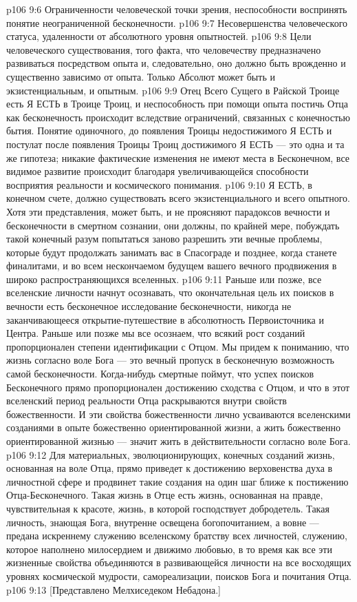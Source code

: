 \vs p106 9:6 \bibnobreakspace Ограниченности человеческой точки зрения, неспособности воспринять понятие неограниченной бесконечности.
\vs p106 9:7 \bibnobreakspace Несовершенства человеческого статуса, удаленности от абсолютного уровня опытностей.
\vs p106 9:8 \bibnobreakspace Цели человеческого существования, того факта, что человечеству предназначено развиваться посредством опыта и, следовательно, оно должно быть врожденно и существенно зависимо от опыта. Только Абсолют может быть и экзистенциальным, и опытным.
\vs p106 9:9 \pc Отец Всего Сущего в Райской Троице есть Я ЕСТЬ в Троице Троиц, и неспособность при помощи опыта постичь Отца как бесконечность происходит вследствие ограничений, связанных с конечностью бытия. Понятие  одиночного, до появления Троицы недостижимого Я ЕСТЬ и постулат  после появления Троицы Троиц достижимого Я ЕСТЬ --- это одна и та же гипотеза; никакие фактические изменения не имеют места в Бесконечном, все видимое развитие происходит благодаря увеличивающейся способности восприятия реальности и космического понимания.
\vs p106 9:10 Я ЕСТЬ, в конечном счете, должно существовать  всего экзистенциального и  всего опытного. Хотя эти представления, может быть, и не проясняют парадоксов вечности и бесконечности в смертном сознании, они должны, по крайней мере, побуждать такой конечный разум попытаться заново разрешить эти вечные проблемы, которые будут продолжать занимать вас в Спасограде и позднее, когда станете финалитами, и во всем нескончаемом будущем вашего вечного продвижения в широко распространяющихся вселенных.
\vs p106 9:11 \pc Раньше или позже, все вселенские личности начнут осознавать, что окончательная цель их поисков в вечности есть бесконечное исследование бесконечности, никогда не заканчивающееся открытие\hyp{}путешествие в абсолютность Первоисточника и Центра. Раньше или позже мы все осознаем, что всякий рост созданий пропорционален степени идентификации с Отцом. Мы придем к пониманию, что жизнь согласно воле Бога --- это вечный пропуск в бесконечную возможность самой бесконечности. Когда\hyp{}нибудь смертные поймут, что успех поисков Бесконечного прямо пропорционален достижению сходства с Отцом, и что в этот вселенский период реальности Отца раскрываются внутри свойств божественности. И эти свойства божественности лично усваиваются вселенскими созданиями в опыте божественно ориентированной жизни, а жить божественно ориентированной жизнью --- значит жить в действительности согласно воле Бога.
\vs p106 9:12 Для материальных, эволюционирующих, конечных созданий жизнь, основанная на воле Отца, прямо приведет к достижению верховенства духа в личностной сфере и продвинет такие создания на один шаг ближе к постижению Отца\hyp{}Бесконечного. Такая жизнь в Отце есть жизнь, основанная на правде, чувствительная к красоте, жизнь, в которой господствует добродетель. Такая личность, знающая Бога, внутренне освещена богопочитанием, а вовне --- предана искреннему служению вселенскому братству всех личностей, служению, которое наполнено милосердием и движимо любовью, в то время как все эти жизненные свойства объединяются в развивающейся личности на все восходящих уровнях космической мудрости, самореализации, поисков Бога и почитания Отца.
\vsetoff
\vs p106 9:13 [Представлено Мелхиседеком Небадона.]
